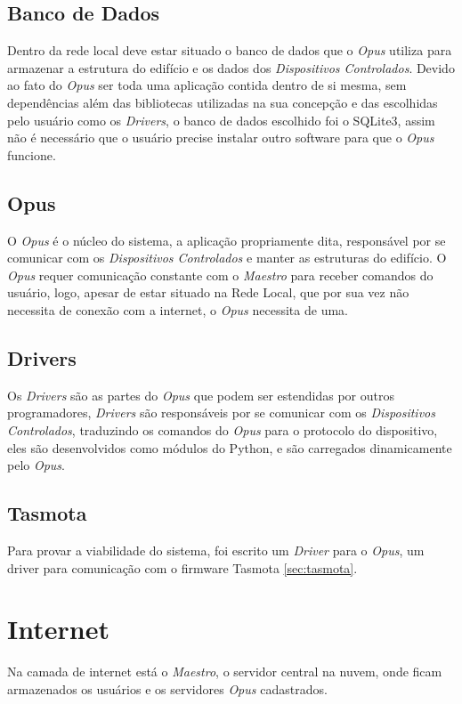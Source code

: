 \subsection{Banco de Dados}
\label{arq-subsubsec:rede-local-banco-dados}
Dentro da rede local deve estar situado o banco de dados que o \emph{Opus} utiliza para armazenar a estrutura
do edifício e os dados dos \emph{Dispositivos Controlados}. Devido ao fato do \emph{Opus} ser toda uma aplicação 
contida dentro de si mesma, sem dependências além das bibliotecas utilizadas na sua concepção e das 
escolhidas pelo usuário como os \emph{Drivers}, o banco de dados escolhido foi o SQLite3, assim não é necessário
que o usuário precise instalar outro software para que o \emph{Opus} funcione.

\subsection{Opus}
\label{arq-subsubsec:rede-local-opus}
O \emph{Opus} é o núcleo do sistema, a aplicação propriamente dita, responsável por se comunicar
com os \emph{Dispositivos Controlados} e manter as estruturas do edifício. O \emph{Opus} requer comunicação
constante com o \emph{Maestro} para receber comandos do usuário, logo, apesar de estar situado na Rede Local, que
por sua vez não necessita de conexão com a internet, o \emph{Opus} necessita de uma.

\subsection{Drivers}
\label{arq-subsubsec:rede-local-drivers}
Os \emph{Drivers} são as partes do \emph{Opus} que podem ser estendidas por outros programadores,
\emph{Drivers} são responsáveis por se comunicar com os \emph{Dispositivos Controlados}, traduzindo
os comandos do \emph{Opus} para o protocolo do dispositivo, eles são desenvolvidos como módulos do 
Python, e são carregados dinamicamente pelo \emph{Opus}.

\subsection{Tasmota}
\label{arq-subsec:rede-local-tasmota}
Para provar a viabilidade do sistema, foi escrito um \emph{Driver} para o \emph{Opus},
um driver para comunicação com o firmware Tasmota \ref{sec:tasmota}.


\section{Internet}
\label{arq-subsec:internet}
Na camada de internet está o \emph{Maestro}, o servidor central na nuvem, onde ficam armazenados
os usuários e os servidores \emph{Opus} cadastrados.

